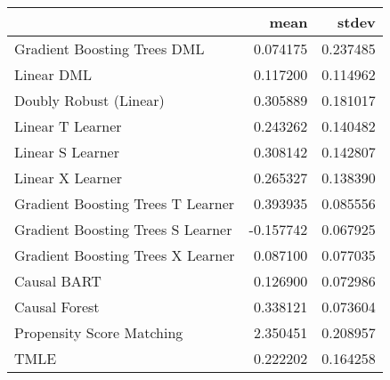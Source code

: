 \begin{tabular}{lrr}
\toprule
{} &      mean &     stdev \\
\midrule
Gradient Boosting Trees DML       &  0.074175 &  0.237485 \\
Linear DML                        &  0.117200 &  0.114962 \\
Doubly Robust (Linear)            &  0.305889 &  0.181017 \\
Linear T Learner                  &  0.243262 &  0.140482 \\
Linear S Learner                  &  0.308142 &  0.142807 \\
Linear X Learner                  &  0.265327 &  0.138390 \\
Gradient Boosting Trees T Learner &  0.393935 &  0.085556 \\
Gradient Boosting Trees S Learner & -0.157742 &  0.067925 \\
Gradient Boosting Trees X Learner &  0.087100 &  0.077035 \\
Causal BART                       &  0.126900 &  0.072986 \\
Causal Forest                     &  0.338121 &  0.073604 \\
Propensity Score Matching         &  2.350451 &  0.208957 \\
TMLE                              &  0.222202 &  0.164258 \\
\bottomrule
\end{tabular}
